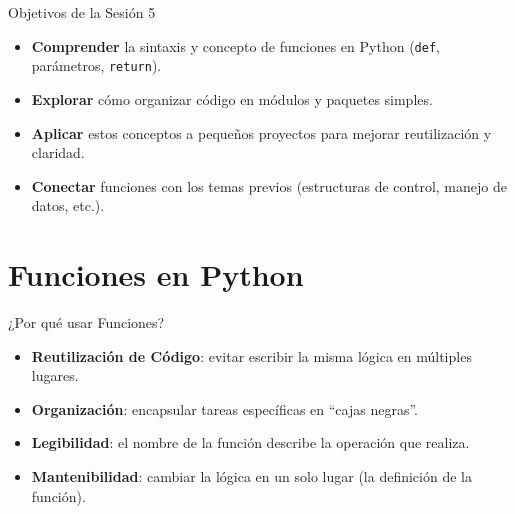 \documentclass[10pt]{beamer}
\begin{document}
\begin{frame}{Objetivos de la Sesión 5}
  \begin{itemize}
    \item \textbf{Comprender} la sintaxis y concepto de funciones en Python (\texttt{def}, parámetros, \texttt{return}).
    \item \textbf{Explorar} cómo organizar código en módulos y paquetes simples.
    \item \textbf{Aplicar} estos conceptos a pequeños proyectos para mejorar reutilización y claridad.
    \item \textbf{Conectar} funciones con los temas previos (estructuras de control, manejo de datos, etc.).
  \end{itemize}
\end{frame}

\section{Funciones en Python}

\begin{frame}{¿Por qué usar Funciones?}
  \begin{itemize}
    \item \textbf{Reutilización de Código}: evitar escribir la misma lógica en múltiples lugares.
    \item \textbf{Organización}: encapsular tareas específicas en “cajas negras”.
    \item \textbf{Legibilidad}: el nombre de la función describe la operación que realiza.
    \item \textbf{Mantenibilidad}: cambiar la lógica en un solo lugar (la definición de la función).
  \end{itemize}
\end{frame}
\end{document}
